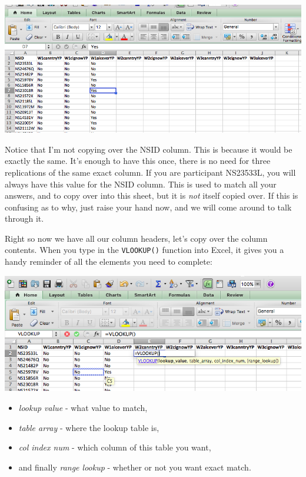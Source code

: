 \documentclass[]{book}
\providecommand{\tightlist}{%
  \setlength{\itemsep}{0pt}\setlength{\parskip}{0pt}}
\theoremstyle{definition}
\theoremstyle{definition}
\theoremstyle{definition}
\theoremstyle{remark}
\begin{document}
\includegraphics{imgs/merge_copy_headers.png}

Notice that I'm not copying over the NSID column. This is because it
would be exactly the same. It's enough to have this once, there is no
need for three replications of the same exact column. If you are
participant NS23533L, you will always have this value for the NSID
column. This is used to match all your answers, and to copy over into
this sheet, but it is \emph{not} itself copied over. If this is
confusing as to why, just raise your hand now, and we will come around
to talk through it.

Right so now we have all our column headers, let's copy over the column
contents. When you type in the \texttt{VLOOKUP()} function into Excel,
it gives you a handy reminder of all the elements you need to complete:

\includegraphics{imgs/vlookup_hints.png}

\begin{itemize}
\tightlist
\item
  \emph{lookup value} - what value to match,
\item
  \emph{table array} - where the lookup table is,
\item
  \emph{col index num} - which column of this table you want,
\item
  and finally \emph{range lookup} - whether or not you want exact match.
\end{itemize}
\end{document}
